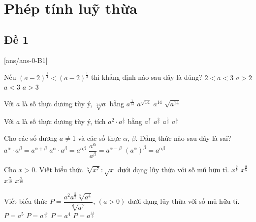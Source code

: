 \section{Phép tính luỹ thừa}

\subsection{Đề 1}
[ans/ans-0-B1]
\caulc
\begin{ex}%
	Nếu $\left(a-2\right)^{\tfrac{1}{4}}<\left(a-2\right)^{\tfrac{1}{3}}$ thì khẳng định nào sau đây là đúng?
	\choice
	{$2 < a < 3$}
	{$a > 2$}
	{$a < 3$}
	{\True $a > 3$}
\end{ex}

\begin{ex}%
	Với $a$ là số thực dương tùy ý, $\sqrt[14]{a}$ bằng
	\choice
	{\True $a^{\tfrac{1}{14}}$}
	{$a^{\sqrt{14}}$}
	{$a^{14}$}
	{$\sqrt{a^{14}}$}
\end{ex}

\begin{ex}%
	Với $a$ là số thực dương tùy ý, tích $a^2\cdot a^{\tfrac{1}{3}}$ bằng
	\choice
	{\True $a^{\tfrac{7}{3}}$}
	{$a^{\tfrac{2}{3}}$}
	{$a^{\tfrac{5}{3}}$}
	{$a^{\tfrac{4}{3}}$}
\end{ex}

\begin{ex}%
	Cho các số dương $a\ne 1$ và các số thực $\alpha $, $\beta $. Đẳng thức nào sau đây là sai?
	\choice
	{$a^\alpha\cdot a^\beta=a^{\alpha+\beta}$}
	{\True $a^\alpha\cdot a^\beta=a^{\alpha\beta}$}
	{$\dfrac{a^\alpha}{a^\beta}=a^{\alpha-\beta}$}
	{$\left(a^\alpha\right)^\beta=a^{\alpha\beta}$}
	\loigiai{
	}
\end{ex}

\begin{ex}%
	Cho $x > 0$. Viết biểu thức $\sqrt[5]{x^7}:\sqrt{x}$ dưới dạng lũy thừa với số mũ hữu tỉ.
	\choice
	{$x^{\tfrac{9}{7}}$}
	{$x^{\tfrac{9}{5}}$}
	{$x^{\tfrac{7}{10}}$}
	{\True $x^{\tfrac{9}{10}}$}
\end{ex}

\begin{ex}%
	Viết biểu thức $P=\dfrac{a^2a^{\tfrac{5}{2}}\sqrt[3]{a^4}}{\sqrt[6]{a^7}}$, $\left(a > 0\right)$ dưới dạng lũy thừa với số mũ hữu tỉ.
	\choice
	{$P=a^5$}
	{\True $P=a^{\tfrac{14}{3}}$}
	{$P=a^4$}
	{$P=a^{\tfrac{13}{3}}$}
\end{ex}

